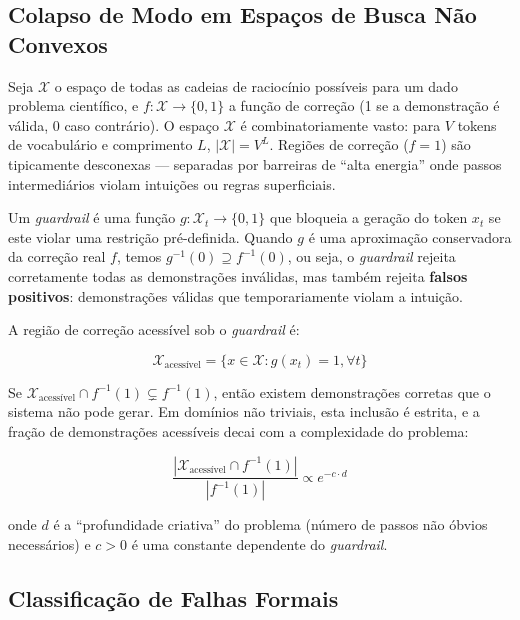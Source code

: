 \documentclass[5p]{elsarticle}
\theoremstyle{remark}
\begin{document}
\subsection{Colapso de Modo em Espaços de Busca Não Convexos}

Seja $\mathcal{X}$ o espaço de todas as cadeias de raciocínio possíveis para um dado problema científico, e $f: \mathcal{X} \to \{0, 1\}$ a função de correção (1 se a demonstração é válida, 0 caso contrário). O espaço $\mathcal{X}$ é combinatoriamente vasto: para $V$ tokens de vocabulário e comprimento $L$, $|\mathcal{X}| = V^L$. Regiões de correção ($f = 1$) são tipicamente desconexas --- separadas por barreiras de ``alta energia'' onde passos intermediários violam intuições ou regras superficiais.

Um \textit{guardrail} é uma função $g: \mathcal{X}_t \to \{0, 1\}$ que bloqueia a geração do token $x_t$ se este violar uma restrição pré-definida. Quando $g$ é uma aproximação conservadora da correção real $f$, temos $g^{-1}(0) \supseteq f^{-1}(0)$, ou seja, o \textit{guardrail} rejeita corretamente todas as demonstrações inválidas, mas também rejeita \textbf{falsos positivos}: demonstrações válidas que temporariamente violam a intuição.

A região de correção acessível sob o \textit{guardrail} é:

\begin{equation}
\mathcal{X}_{\text{acessível}} = \{x \in \mathcal{X} : g(x_t) = 1, \forall t\}
\label{eq:accessible}
\end{equation}

Se $\mathcal{X}_{\text{acessível}} \cap f^{-1}(1) \subsetneq f^{-1}(1)$, então existem demonstrações corretas que o sistema não pode gerar. Em domínios não triviais, esta inclusão é estrita, e a fração de demonstrações acessíveis decai com a complexidade do problema:

\begin{equation}
\frac{|\mathcal{X}_{\text{acessível}} \cap f^{-1}(1)|}{|f^{-1}(1)|} \propto e^{-c \cdot d}
\label{eq:decay}
\end{equation}

onde $d$ é a ``profundidade criativa'' do problema (número de passos não óbvios necessários) e $c > 0$ é uma constante dependente do \textit{guardrail}.

\subsection{Classificação de Falhas Formais}
\end{document}
